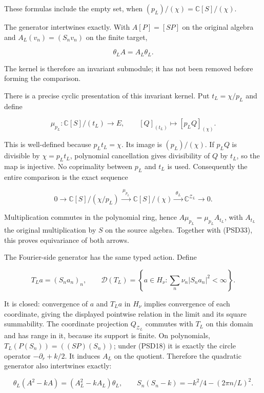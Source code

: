 \documentclass{article}
\begin{document}
These formulas include the empty set, when \((p_L)/(\chi)=\mathbb C[S]/(\chi)\).

The generator intertwines exactly. With \(A[P]=[SP]\) on the original algebra and \(A_L(v_n)=(S_nv_n)\) on the finite target,

\[
\theta_LA=A_L\theta_L.
\tag{PSD33}
\]

The kernel is therefore an invariant submodule; it has not been removed before forming the comparison.

There is a precise cyclic presentation of this invariant kernel. Put \(t_L=\chi/p_L\) and define

\[
\mu_{p_L}:\mathbb C[S]/(t_L)\longrightarrow E,
\qquad [Q]_{(t_L)}\longmapsto[p_LQ]_{(\chi)}.
\tag{PSD33a}
\]

This is well-defined because \(p_L t_L=\chi\). Its image is \((p_L)/(\chi)\). If \(p_LQ\) is divisible by \(\chi=p_Lt_L\), polynomial cancellation gives divisibility of \(Q\) by \(t_L\), so the map is injective. No coprimality between \(p_L\) and \(t_L\) is used. Consequently the entire comparison is the exact sequence

\[
0\longrightarrow\mathbb C[S]/(\chi/p_L)
\xrightarrow{\;\mu_{p_L}\;}\mathbb C[S]/(\chi)
\xrightarrow{\;\theta_L\;}\mathbb C^{\mathcal Z_L}
\longrightarrow0.
\tag{PSD33b}
\]

Multiplication commutes in the polynomial ring, hence \(A\mu_{p_L}=\mu_{p_L}A_{t_L}\), with \(A_{t_L}\) the original multiplication by \(S\) on the source algebra. Together with (PSD33), this proves equivariance of both arrows.

The Fourier-side generator has the same typed action. Define

\[
T_La=(S_na_n)_n,\qquad
\mathcal D(T_L)=\left\{a\in H_\nu:\sum_n\nu_n|S_na_n|^2<\infty\right\}.
\tag{PSD33c}
\]

It is closed: convergence of \(a\) and \(T_La\) in \(H_\nu\) implies convergence of each coordinate, giving the displayed pointwise relation in the limit and its square summability. The coordinate projection \(Q_{\mathcal Z_L}\) commutes with \(T_L\) on this domain and has range in it, because its support is finite. On polynomials, \(T_L(P(S_n))=((SP)(S_n))\); under (PSD18) it is exactly the circle operator \(-\partial_r+k/2\). It induces \(A_L\) on the quotient. Therefore the quadratic generator also intertwines exactly:

\[
\theta_L(A^2-kA)=(A_L^2-kA_L)\theta_L,
\qquad S_n(S_n-k)=-k^2/4-(2\pi n/L)^2.
\tag{PSD33d}
\]
\end{document}
